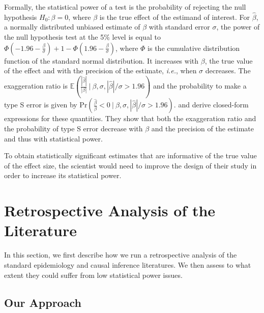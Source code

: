 \documentclass[12pt]{article}
\begin{document}
    Formally, the statistical power of a test is the probability of rejecting the null hypothesis $H_{0}: \beta = 0$, where $\beta$ is the true effect of the estimand of interest. For $\hat{\beta}$, a normally distributed unbiased estimate of $\beta$ with standard error $\sigma$, the power of the null hypothesis test at the 5\% level is equal to $\Phi\left(-1.96-\frac{\beta}{\sigma}\right)+1-\Phi\left(1.96-\frac{\beta}{\sigma}\right)$, where $\Phi$ is the cumulative distribution function of the standard normal distribution. It increases with $\beta$, the true value of the effect and with the precision of the estimate, \textit{i.e.}, when $\sigma$ decreases. The exaggeration ratio is $\mathbb{E}\left(\frac{|\hat{\beta}|}{|\beta|} \ \bigg| \ \beta, \sigma, |\hat{\beta}|/\sigma>1.96\right)$ and the probability to make a type S error is given by $\text{Pr}\left(\frac{\hat{\beta}}{\beta} < 0 \ \bigg| \ \beta, \sigma, |\hat{\beta}|/\sigma>1.96 \right)$.  \cite{zwet_significance_2021} and \cite{lu_note_2019} derive closed-form expressions for these quantities. They show that both the exaggeration ratio and the probability of type S error decrease with $\beta$ and the precision of the estimate and thus with statistical power. %

    To obtain statistically significant estimates that are informative of the true value of the effect size, the scientist would need to improve the design of their study in order to increase its statistical power.
    



\section{Retrospective Analysis of the Literature}

    In this section, we first describe how we run a retrospective analysis of the standard epidemiology and causal inference literatures. We then assess to what extent they could suffer from low statistical power issues.
    
    \subsection{Our Approach}
    
\end{document}
